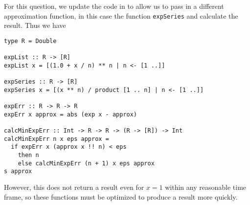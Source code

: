 
For this question, we update the code in  to allow us
to pass in a different approximation function, in this case the function \verb|expSeries|
and calculate the result. Thus we have
\begin{verbatim}
type R = Double

expList :: R -> [R]
expList x = [(1.0 + x / n) ** n | n <- [1 ..]]

expSeries :: R -> [R]
expSeries x = [(x ** n) / product [1 .. n] | n <- [1 ..]]

expErr :: R -> R -> R
expErr x approx = abs (exp x - approx)

calcMinExpErr :: Int -> R -> R -> (R -> [R]) -> Int
calcMinExpErr n x eps approx =
  if expErr x (approx x !! n) < eps
    then n
    else calcMinExpErr (n + 1) x eps approx
s approx
\end{verbatim}
However, this does not return a result even for $x = 1$ within any reasonable time frame,
so these functions must be optimized to produce a result more quickly.
